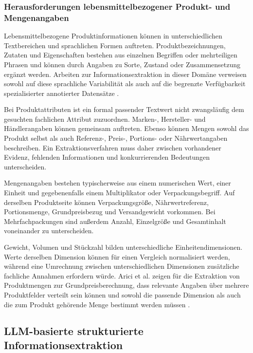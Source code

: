 \subsubsection{Herausforderungen lebensmittelbezogener Produkt- und Mengenangaben}

Lebensmittelbezogene Produktinformationen können in unterschiedlichen Textbereichen und sprachlichen Formen auftreten. Produktbezeichnungen, Zutaten und Eigenschaften 
bestehen aus einzelnen Begriffen oder mehrteiligen Phrasen und können durch Angaben zu Sorte, Zustand oder Zusammensetzung ergänzt werden. Arbeiten zur Informationsextraktion 
in dieser Domäne verweisen sowohl auf diese sprachliche Variabilität als auch auf die begrenzte Verfügbarkeit spezialisierter annotierter Datensätze \cite{popovski2020survey}.

Bei Produktattributen ist ein formal passender Textwert nicht zwangsläufig dem gesuchten fachlichen Attribut zuzuordnen. Marken-, Hersteller- und Händlerangaben können 
gemeinsam auftreten. Ebenso können Mengen sowohl das Produkt selbst als auch Referenz-, Preis-, Portions- oder Nährwertangaben beschreiben. Ein Extraktionsverfahren muss 
daher zwischen vorhandener Evidenz, fehlenden Informationen und konkurrierenden Bedeutungen unterscheiden.

Mengenangaben bestehen typischerweise aus einem numerischen Wert, einer Einheit und gegebenenfalls einem Multiplikator oder Verpackungsbegriff. Auf derselben Produktseite 
können Verpackungsgröße, Nährwertreferenz, Portionsmenge, Grundpreisbezug und Versandgewicht vorkommen. Bei Mehrfachpackungen sind außerdem Anzahl, Einzelgröße und Gesamtinhalt 
voneinander zu unterscheiden.

Gewicht, Volumen und Stückzahl bilden unterschiedliche Einheitendimensionen. Werte derselben Dimension können für einen Vergleich normalisiert werden, während eine Umrechnung 
zwischen unterschiedlichen Dimensionen zusätzliche fachliche Annahmen erfordern würde. Arici et al. zeigen für die Extraktion von Produktmengen zur Grundpreisberechnung, dass 
relevante Angaben über mehrere Produktfelder verteilt sein können und sowohl die passende Dimension als auch die zum Produkt gehörende Menge bestimmt werden müssen 
\cite{arici2021priceperunit}.

\subsection{LLM-basierte strukturierte Informationsextraktion}

